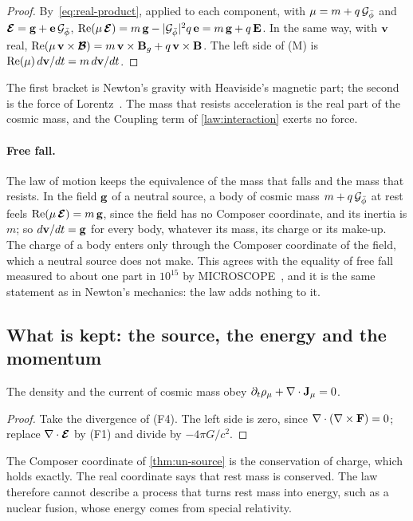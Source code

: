 \begin{proof}
By~\cref{eq:real-product}, applied to each component, with $\mu = m + q\,\mathcal{G}_{\bar{\phi}}$ and $\boldsymbol{\mathcal{E}} = \mathbf{g} + \mathbf{e}\,\mathcal{G}_{\bar{\phi}}$, $\operatorname{Re}(\mu\,\boldsymbol{\mathcal{E}}) = m\,\mathbf{g} - \lvert\mathcal{G}_{\bar{\phi}}\rvert^2 q\,\mathbf{e} = m\,\mathbf{g} + q\,\mathbf{E}$. In the same way, with $\mathbf{v}$ real, $\operatorname{Re}(\mu\,\mathbf{v}\times\boldsymbol{\mathcal{B}}) = m\,\mathbf{v}\times\mathbf{B}_g + q\,\mathbf{v}\times\mathbf{B}$. The left side of (M) is $\operatorname{Re}(\mu)\,d\mathbf{v}/dt = m\,d\mathbf{v}/dt$.
\end{proof}

The first bracket is Newton's gravity with Heaviside's magnetic part; the second is the force of Lorentz~\citep{Lorentz1895}. The mass that resists acceleration is the real part of the cosmic mass, and the Coupling term of \cref{law:interaction} exerts no force.

\paragraph{Free fall.} The law of motion keeps the equivalence of the mass that falls and the mass that resists. In the field $\mathbf{g}$ of a neutral source, a body of cosmic mass $m + q\,\mathcal{G}_{\bar{\phi}}$ at rest feels $\operatorname{Re}(\mu\,\boldsymbol{\mathcal{E}}) = m\,\mathbf{g}$, since the field has no Composer coordinate, and its inertia is $m$; so $d\mathbf{v}/dt = \mathbf{g}$ for every body, whatever its mass, its charge or its make-up. The charge of a body enters only through the Composer coordinate of the field, which a neutral source does not make. This agrees with the equality of free fall measured to about one part in $10^{15}$ by MICROSCOPE~\citep{Touboul2022}, and it is the same statement as in Newton's mechanics: the law adds nothing to it.

\subsection{What is kept: the source, the energy and the momentum}\label{subsec:un-kept}

\begin{theorem}\label{thm:un-source}
The density and the current of cosmic mass obey $\partial_t\rho_\mu + \nabla\cdot\mathbf{J}_\mu = 0$.
\end{theorem}

\begin{proof}
Take the divergence of (F4). The left side is zero, since $\nabla\cdot(\nabla\times\mathbf{F}) = 0$; replace $\nabla\cdot\boldsymbol{\mathcal{E}}$ by (F1) and divide by $-4\pi G/c^2$.
\end{proof}

The Composer coordinate of \cref{thm:un-source} is the conservation of charge, which holds exactly. The real coordinate says that rest mass is conserved. The law therefore cannot describe a process that turns rest mass into energy, such as a nuclear fusion, whose energy comes from special relativity.

